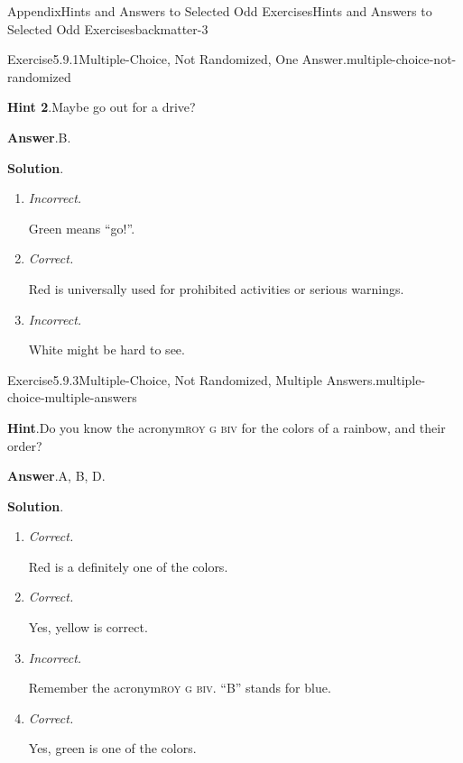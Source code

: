 \documentclass[oneside,10pt,]{book}
\newcommand{\blocktitlefont}{\relax}
\newcommand{\acronym}[1]{\textsc{\MakeLowercase{#1}}}
\newcommand{\lititle}[1]{{\slshape#1}}
\numberwithin{equation}{section}
\begin{document}
\begin{solutions-chapter}{Appendix}{Hints and Answers to Selected Odd Exercises}{}{Hints and Answers to Selected Odd Exercises}{}{}{backmatter-3}
\begin{divisionsolution}{Exercise}{5.9.1}{Multiple-Choice, Not Randomized, One Answer.}{multiple-choice-not-randomized}
\par\smallskip%
\noindent\textbf{\blocktitlefont Hint 2}.\hypertarget{multiple-choice-not-randomized-5-back}{}\quad{}Maybe go out for a drive?%
\par\smallskip%
\noindent\textbf{\blocktitlefont Answer}.\hypertarget{multiple-choice-not-randomized-6-back}{}\quad{}B.%
\par\smallskip%
\noindent\textbf{\blocktitlefont Solution}.\hypertarget{multiple-choice-not-randomized-7-back}{}\quad{}%
\begin{enumerate}[label={\Alph*.}]
\item{}\lititle{Incorrect.}\par%
Green means ``go!''.%
\item{}\lititle{Correct.}\par%
Red is universally used for prohibited activities or serious warnings.%
\item{}\lititle{Incorrect.}\par%
White might be hard to see.%
\end{enumerate}
%
\end{divisionsolution}%
\begin{divisionsolution}{Exercise}{5.9.3}{Multiple-Choice, Not Randomized, Multiple Answers.}{multiple-choice-multiple-answers}%
\par\smallskip%
\noindent\textbf{\blocktitlefont Hint}.\hypertarget{multiple-choice-multiple-answers-4-back}{}\quad{}Do you know the acronym\textellipsis{}\acronym{ROY G BIV} for the colors of a rainbow, and their order?%
\par\smallskip%
\noindent\textbf{\blocktitlefont Answer}.\hypertarget{multiple-choice-multiple-answers-5-back}{}\quad{}A, B, D.%
\par\smallskip%
\noindent\textbf{\blocktitlefont Solution}.\hypertarget{multiple-choice-multiple-answers-6-back}{}\quad{}%
\begin{enumerate}[label={\Alph*.}]
\item{}\lititle{Correct.}\par%
Red is a definitely one of the colors.%
\item{}\lititle{Correct.}\par%
Yes, yellow is correct.%
\item{}\lititle{Incorrect.}\par%
Remember the acronym\textellipsis{}\acronym{ROY G BIV}.  ``B'' stands for blue.%
\item{}\lititle{Correct.}\par%
Yes, green is one of the colors.%

\end{enumerate}
\end{divisionsolution}
\end{solutions-chapter}
\end{document}

